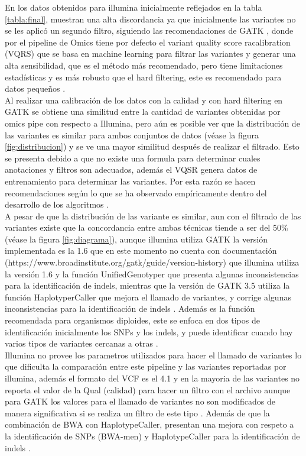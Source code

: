 En los datos obtenidos para illumina inicialmente reflejados en la tabla \ref{tabla:final}, muestran una alta discordancia ya que inicialmente las variantes no se les aplicó un segundo filtro, siguiendo las recomendaciones de  GATK , donde por el pipeline de Omics tiene por defecto el variant quality score racalibration (VQRS) que se basa en machine learning para filtrar las variantes y generar una alta sensibilidad, que es el método más recomendado, pero tiene limitaciones estadísticas y es más robusto que el hard filtering, este es recomendado para datos pequeños \cite{Auwera2014}. \\

Al realizar una calibración de los datos con la calidad y con hard filtering en GATK se obtiene una similitud entre la cantidad de variantes obtenidas por omics pipe con respecto a Illumina, pero aún es posible ver que la distribución de las variantes es similar para ambos conjuntos de datos (véase la figura \ref{fig:distribucion}) y se ve una mayor similitud  después de realizar el filtrado. Esto se presenta debido a que no existe una formula para determinar cuales anotaciones y filtros son adecuados, además el VQSR genera datos de entrenamiento para determinar las variantes. Por esta razón se hacen recomendaciones según lo que se ha observado empíricamente dentro del desarrollo de los algoritmos \cite{Auwera2014}. \\

A pesar de que la distribución de las variante es similar, aun con el filtrado de las variantes existe que la concordancia entre ambas técnicas tiende a ser del 50\% (véase la figura \ref{fig:diagrama}), aunque illumina utiliza GATK la versión implementada es la 1.6 que en este momento no cuenta con documentación (https://www.broadinstitute.org/gatk/guide/version-history) que illumina utiliza la versión 1.6 y la función UnifiedGenotyper que presenta algunas inconsistencias para la identificación de indels, mientras que la versión de GATK 3.5 utiliza la función HaplotyperCaller que mejora el llamado de variantes, y corrige algunas inconsistencias para la identificación de indels \cite{ORawe2013}. Además es la función recomendada para organismos diploides, este se enfoca en dos tipos de identificación inicialmente los SNPs y los indels, y puede identificar cuando hay varios tipos de variantes cercanas a otras \cite{Auwera2014}. \\

Illumina no provee los parametros utilizados para hacer el llamado de variantes lo que dificulta la comparación entre este pipeline y las variantes reportadas por illumina, además el formato del VCF es el 4.1 y en la mayoria de las variantes no reporta el valor de la Qual (calidad) para hacer un filtro con el archivo aunque para GATK los valores para el llamado de variantes no son modificados de manera significativa si se realiza un filtro de este tipo \cite{Hwang2015}. Además de que la combinación de BWA con HaplotypeCaller, presentan una mejora con respeto a la identificación de SNPs (BWA-men) y HaplotypeCaller para la identificación de indels \cite{Cornish2015}.

